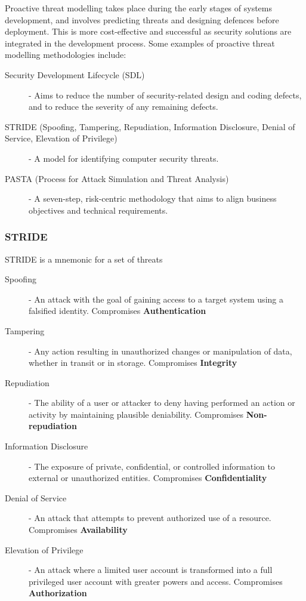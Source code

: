 \documentclass[12pt letter]{report}
\begin{document}
Proactive threat modelling takes place during the early stages of
systems development, and involves predicting threats and designing
defences before deployment. This is more cost-effective and
successful as security solutions are integrated in the development process.
Some examples of proactive threat modelling methodologies include:
\begin{description}
  \item[Security Development Lifecycle (SDL)] - Aims to reduce the
    number of security-related design and coding defects, and to
    reduce the severity of any remaining defects.
  \item[STRIDE (Spoofing, Tampering, Repudiation, Information
    Disclosure, Denial of Service, Elevation of Privilege)] - A model
    for identifying computer security threats.
  \item[PASTA (Process for Attack Simulation and Threat Analysis)] - A
    seven-step, risk-centric methodology that aims to align business
    objectives and technical requirements.
\end{description}

\subsubsection{STRIDE}

STRIDE is a mnemonic for a set of threats
\begin{description}
  \item[Spoofing] - An attack with the goal of gaining access to a
    target system using a falsified identity. Compromises
    \textbf{Authentication}
  \item[Tampering] - Any action resulting in unauthorized changes or
    manipulation of data, whether in transit or in storage.
    Compromises \textbf{Integrity}
  \item[Repudiation] - The ability of a user or attacker to deny
    having performed an action or activity by maintaining plausible
    deniability. Compromises \textbf{Non-repudiation}
  \item[Information Disclosure] - The exposure of private,
    confidential, or controlled information to external or
    unauthorized entities. Compromises \textbf{Confidentiality}
  \item[Denial of Service] - An attack that attempts to prevent
    authorized use of a resource. Compromises \textbf{Availability}
  \item[Elevation of Privilege] - An attack where a limited user
    account is transformed into a full privileged user account with
    greater powers and access. Compromises \textbf{Authorization}
\end{description}
\end{document}
